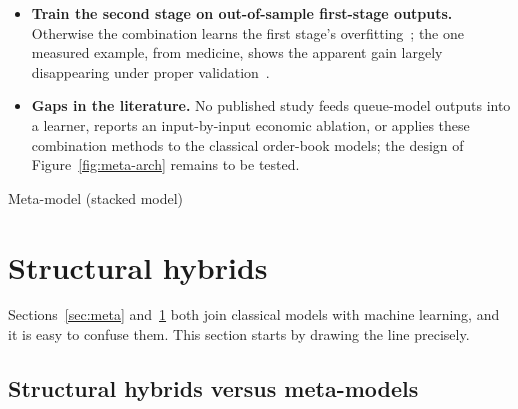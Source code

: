 \begin{itemize}[leftmargin=1.5em,itemsep=3pt]
  sample, scored properly, with every configuration counted.
\item \textbf{Train the second stage on out-of-sample first-stage outputs.} Otherwise the combination learns the
  first stage's overfitting~\citep{breiman1996stack}; the one measured example, from medicine, shows the
  apparent gain largely disappearing under proper validation~\citep{tibshirani2002preval}.
\item \textbf{Gaps in the literature.} No published study feeds queue-model outputs into a learner, reports an
  input-by-input economic ablation, or applies these combination methods to the classical order-book models;
  the design of Figure~\ref{fig:meta-arch} remains to be tested.
\end{itemize}

\begin{modelcard}{Meta-model (stacked model)}
\end{modelcard}

\section{Structural hybrids}
\label{sec:hybrid}

Sections~\ref{sec:meta} and~\ref{sec:hybrid} both join classical models with machine learning, and it is
easy to confuse them. This section starts by drawing the line precisely.

\subsection{Structural hybrids versus meta-models}
\label{sec:hybrid-vs-meta}

